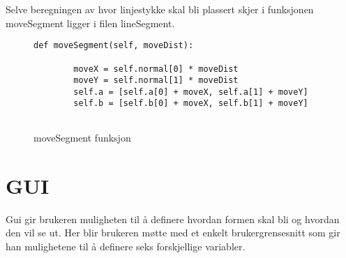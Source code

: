 Selve beregningen av hvor linjestykke skal bli plassert skjer i funksjonen moveSegment ligger i filen lineSegment. 
\begin{figure}
\lstset{language=Python, breaklines=true,} 
\begin{lstlisting}[frame=single]  
    def moveSegment(self, moveDist):
        
        moveX = self.normal[0] * moveDist
        moveY = self.normal[1] * moveDist
        self.a = [self.a[0] + moveX, self.a[1] + moveY]
        self.b = [self.b[0] + moveX, self.b[1] + moveY]
        

\end{lstlisting}
    \caption{moveSegment funksjon}
        \label{fig:my_label}
\end{figure}
\section{GUI}
Gui gir brukeren muligheten til å definere hvordan formen skal bli og hvordan den vil se ut. Her blir brukeren møtte med et enkelt brukergrensesnitt som gir han mulighetene til å definere seks forskjellige variabler.